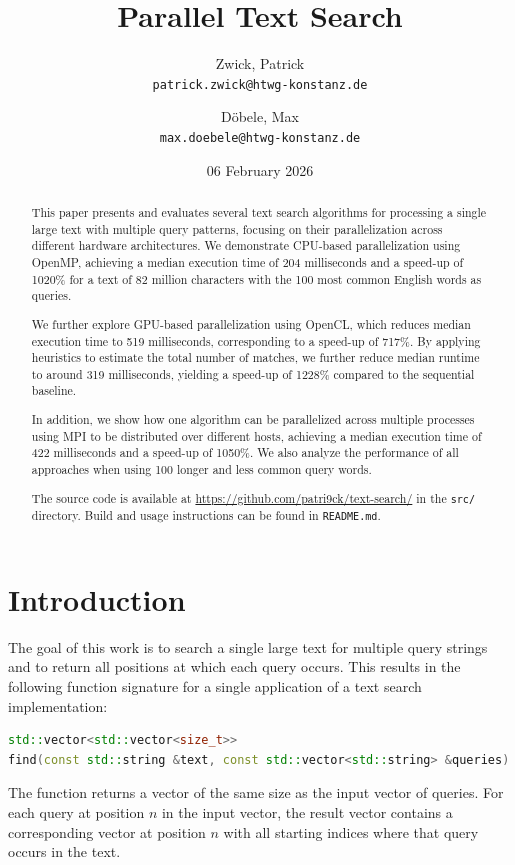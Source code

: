 \documentclass{article}
\title{Parallel Text Search}
\author{
    Zwick, Patrick\\
    \texttt{patrick.zwick@htwg-konstanz.de}
    \and
    Döbele, Max\\
    \texttt{max.doebele@htwg-konstanz.de}
}
\date{06 February 2026}
\begin{document}
    \maketitle

    \begin{abstract}
        This paper presents and evaluates several text search algorithms for processing a single large text with multiple query patterns, focusing on their parallelization across different hardware architectures.
        We demonstrate CPU-based parallelization using OpenMP, achieving a median execution time of 204 milliseconds and a speed-up of 1020\% for a text of 82 million characters with the 100 most common English words as queries.

        We further explore GPU-based parallelization using OpenCL, which reduces median execution time to 519 milliseconds, corresponding to a speed-up of 717\%.
        By applying heuristics to estimate the total number of matches, we further reduce median runtime to around 319 milliseconds, yielding a speed-up of 1228\% compared to the sequential baseline.

        In addition, we show how one algorithm can be parallelized across multiple processes using MPI to be distributed over different hosts, achieving a median execution time of 422 milliseconds and a speed-up of 1050\%.
        We also analyze the performance of all approaches when using 100 longer and less common query words.

        The source code is available at \url{https://github.com/patri9ck/text-search/} in the \texttt{src/} directory.
        Build and usage instructions can be found in \texttt{README.md}.
    \end{abstract}


    \section{Introduction}
    The goal of this work is to search a single large text for multiple query strings and to return all positions at which each query occurs.
    This results in the following function signature for a single application of a text search implementation:

    \begin{lstlisting}[language=C++]
std::vector<std::vector<size_t>>
find(const std::string &text, const std::vector<std::string> &queries)
    \end{lstlisting}

    The function returns a vector of the same size as the input vector of queries.
    For each query at position $n$ in the input vector, the result vector contains a corresponding vector at position $n$ with all starting indices where that query occurs in the text.
\end{document}
